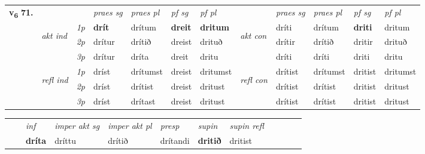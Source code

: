 \begin{tabular}{llllllllllll} \toprule
\multirow{4}{*}{{{\textbf{v{\textsubscript{6}}} \Large{\textbf{71.}}}}}  & &   &  \textit{praes sg}  & \textit{praes pl}  &\textit{ pf sg} & \textit{pf pl} &  &  \textit{praes sg}  & \textit{praes pl}  & \textit{pf sg} & \textit{pf pl } \\*
	\cmidrule{4-7} \cmidrule{9-12}
 & \multirow{3}{*}{\begin{turn}{90}\textit{akt ind}\end{turn}} & {\textit{1p}} & \textbf{drít} & drítum    & \textbf{dreit} & \textbf{dritum} & \multirow{3}{*}{\begin{turn}{90}\textit{akt con}\end{turn}} &dríti & drítum & \textbf{driti} & dritum\\*
& &  {\textit{2p}} &  drítur  & drítið   & dreist & drituð & & drítir & drítið & dritir & drituð \\*
& &  {\textit{3p}} & drítur & dríta   & dreit & dritu & & dríti & dríti& driti & dritu  \\*
\cmidrule{4-7} \cmidrule{9-12}
 &\multirow{3}{*}{\begin{turn}{90}\textit{refl ind}\end{turn}} & {\textit{1p}} & dríst & drítumst    & dreist & dritumst & \multirow{3}{*}{\begin{turn}{90}\textit{refl con}\end{turn}}  &drítist & drítumst & dritist & dritumst\\*
 &&  {\textit{2p}} &  dríst  & drítist   & dreist & dritust & &drítist & drítist & dritist & dritust \\*
& &  {\textit{3p}} & dríst & drítast   & dreist & dritust & & drítist & drítist& dritist & dritust  \\*
\cmidrule{4-7} \cmidrule{9-12}
\end{tabular}


\begin{tabular}{llllllllllll}
 & & \textit{inf} & \textit{imper akt sg} & \textit{imper akt pl}   & \textit{presp} & \textit{supin} & \textit{supin refl}      \\*
  & & \textbf{dríta} & dríttu  & drítið   & drítandi &  \textbf{dritið} & dritist  \\*
\cmidrule{1-12}
\end{tabular}



